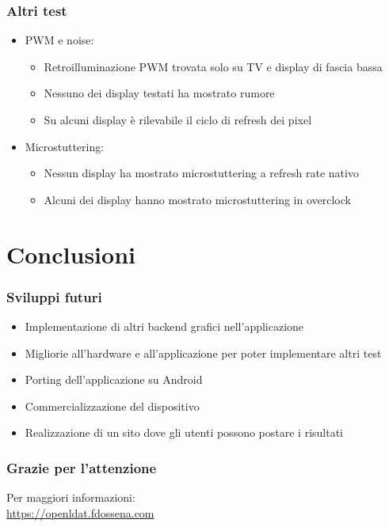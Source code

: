 \documentclass[xcolor={x11names}]{beamer}
\begin{document}
\begin{frame}[fragile,shrink=20]
\begin{minipage}[c][\paperheight][c]{\textwidth}
\begin{minipage}{0.33\textwidth}
\begin{figure}
			\end{figure}
		\end{minipage}
	\end{minipage}
\end{frame}
\begin{frame}
	\frametitle{Altri test}
	\begin{itemize}
		\setlength\itemsep{4mm}
		\item PWM e noise: \begin{itemize}
			\item \alert{Retroilluminazione PWM trovata solo su TV e display di fascia bassa}
			\item Nessuno dei display testati ha mostrato rumore
			\item \alert{Su alcuni display è rilevabile il ciclo di refresh dei pixel}
		\end{itemize}
		\item Microstuttering: \begin{itemize}
			\item \alert{Nessun display ha mostrato microstuttering a refresh rate nativo}
			\item Alcuni dei display hanno mostrato microstuttering in overclock
		\end{itemize}
	\end{itemize}
\end{frame}

\section{Conclusioni}
\begin{frame}
	\frametitle{Sviluppi futuri}
	\begin{itemize}
        \item Implementazione di \alert{altri backend grafici} nell'applicazione
        \item Migliorie all'hardware e all'applicazione per poter implementare \alert{altri test}
        \item Porting dell'applicazione su Android
        \item \alert{Commercializzazione del dispositivo}
        \item Realizzazione di un sito dove gli utenti possono postare i risultati
	\end{itemize}
\end{frame}
\begin{frame}
	\frametitle{Grazie per l'attenzione}
	\centering
	Per maggiori informazioni:\\
	\alert{\url{https://openldat.fdossena.com}}
\end{frame}
\end{document}
